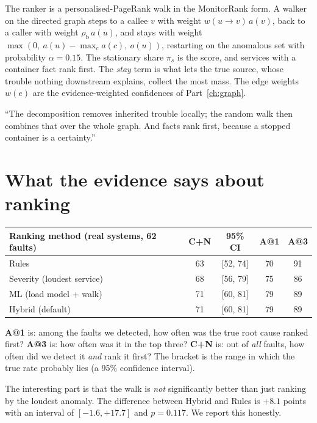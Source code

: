 \begin{techbox}
The ranker is a personalised-PageRank walk in the MonitorRank form. A walker on the directed graph steps to a callee $v$ with weight $w(u\to v)\,a(v)$, back to a caller with weight $\rho_{\mathrm b}\,a(u)$, and stays with weight $\max(0,\ a(u)-\max_c a(c),\ o(u))$, restarting on the anomalous set with probability $\alpha=0.15$. The stationary share $\pi_s$ is the score, and services with a container fact rank first. The \emph{stay} term is what lets the true source, whose trouble nothing downstream explains, collect the most mass. The edge weights $w(e)$ are the evidence-weighted confidences of Part~\ref{ch:graph}.
\end{techbox}

\begin{saybox}
``The decomposition removes inherited trouble locally; the random walk then combines that over the whole graph. And facts rank first, because a stopped container is a certainty.''
\end{saybox}

\section{What the evidence says about ranking}
\begin{center}
\small
\begin{tabular}{lcccc}
\toprule
Ranking method (real systems, 62 faults) & C+N & 95\% CI & A@1 & A@3\\
\midrule
Rules & 63 & [52, 74] & 70 & 91\\
Severity (loudest service) & 68 & [56, 79] & 75 & 86\\
ML (load model + walk) & 71 & [60, 81] & 79 & 89\\
Hybrid (default) & 71 & [60, 81] & 79 & 89\\
\bottomrule
\end{tabular}
\end{center}

\begin{simplebox}
\textbf{A@1} is: among the faults we detected, how often was the true root cause ranked first? \textbf{A@3} is: how often was it in the top three? \textbf{C+N} is: out of \emph{all} faults, how often did we detect it \emph{and} rank it first? The bracket is the range in which the true rate probably lies (a 95\% confidence interval).

The interesting part is that the walk is \emph{not} significantly better than just ranking by the loudest anomaly. The difference between Hybrid and Rules is $+8.1$ points with an interval of $[-1.6,+17.7]$ and $p=0.117$. We report this honestly.
\end{simplebox}

